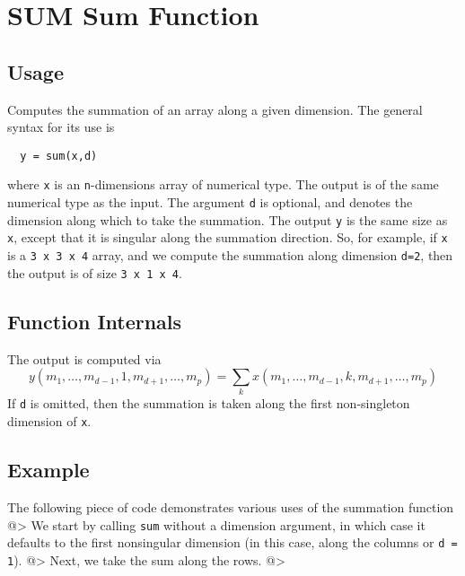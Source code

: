 \section{SUM Sum Function}

\subsection{Usage}

Computes the summation of an array along a given dimension.  The general
syntax for its use is
\begin{verbatim}
  y = sum(x,d)
\end{verbatim}
where \verb|x| is an \verb|n|-dimensions array of numerical type.
The output is of the same numerical type as the input.  The argument
\verb|d| is optional, and denotes the dimension along which to take
the summation.  The output \verb|y| is the same size as \verb|x|, except
that it is singular along the summation direction.  So, for example,
if \verb|x| is a \verb|3 x 3 x 4| array, and we compute the summation along
dimension \verb|d=2|, then the output is of size \verb|3 x 1 x 4|.
\subsection{Function Internals}

The output is computed via
\[
y(m_1,\ldots,m_{d-1},1,m_{d+1},\ldots,m_{p}) = 
\sum_{k} x(m_1,\ldots,m_{d-1},k,m_{d+1},\ldots,m_{p})
\]
If \verb|d| is omitted, then the summation is taken along the 
first non-singleton dimension of \verb|x|. 
\subsection{Example}

The following piece of code demonstrates various uses of the summation
function
@>
We start by calling \verb|sum| without a dimension argument, in which 
case it defaults to the first nonsingular dimension (in this case, 
along the columns or \verb|d = 1|).
@>
Next, we take the sum along the rows.
@>
